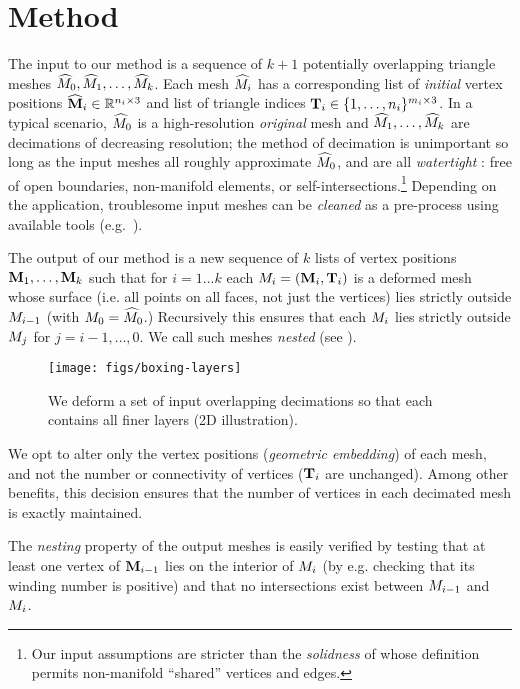 \section{Method}
\label{sec:method}

The input to our method is a sequence of $k+1$ potentially overlapping triangle
meshes $\widehat{M}_0,\widehat{M}_1,\dots,\widehat{M}_k$.
%
Each mesh $\widehat{M}_i$ has a corresponding list of \emph{initial} vertex positions
$\widehat{\mathbf{M}}_i \in \mathbb{R}^{n_i \times 3}$ and list of triangle indices $\mathbf{T}_i \in
\{1,\dots,n_i\}^{m_i \times 3}$.
%
In a typical scenario, $\widehat{M}_0$ is a high-resolution \emph{original} mesh and
$\widehat{M}_1,\dots,\widehat{M}_k$ are decimations of decreasing resolution; the method of
decimation is unimportant so long as the input meshes all roughly approximate
$\widehat{M}_0$, and are all \emph{watertight} \cite{Dey:2003jf}:
%
free of open boundaries, non-manifold elements, or
self-intersections.\footnote{Our input assumptions are stricter than the
\emph{solidness} of \cite{Bernstein:2013:PHH} whose definition permits
non-manifold ``shared'' vertices and edges.}
%
Depending on the application, troublesome input meshes can be \emph{cleaned} as
a pre-process using available tools (e.g.\
\cite{Attene:2010vv,Jacobson:WN:2013}).

The output of our method is a new sequence of $k$ lists of vertex positions
$\mathbf{M}_1,\dots,\mathbf{M}_k$ such that for $i=1\dots k$ each $M_i =
(\mathbf{M}_i,\mathbf{T}_i)$ is a deformed mesh whose surface (i.e. all points on all
faces, not just the vertices) lies strictly outside $M_{i-1}$ (with
$M_0 = \widehat{M}_0$.) Recursively this ensures that each $M_i$ lies
strictly outside $M_j$ for $j=i-1,\dots,0$. We call such meshes
\emph{nested} (see \reffig{boxing-layers}).

\begin{figure}
  \texttt{[image: figs/boxing-layers]}
  \caption{We deform a set of input overlapping decimations so that each
  contains all finer layers (2D illustration).}
  \label{fig:boxing-layers}
\end{figure}

We opt to alter only the vertex positions (\emph{geometric embedding}) of each
mesh, and not the number or connectivity of vertices ($\mathbf{T}_i$ are unchanged).
Among other benefits, this decision ensures that the number of vertices
in each decimated mesh is exactly maintained.

The \emph{nesting} property of the output meshes is easily verified by
testing that at least one vertex of $\mathbf{M}_{i-1}$ lies on the interior of
$M_i$ (by e.g. checking that its winding number is positive)
and that no intersections exist between $M_{i-1}$ and $M_i$.

